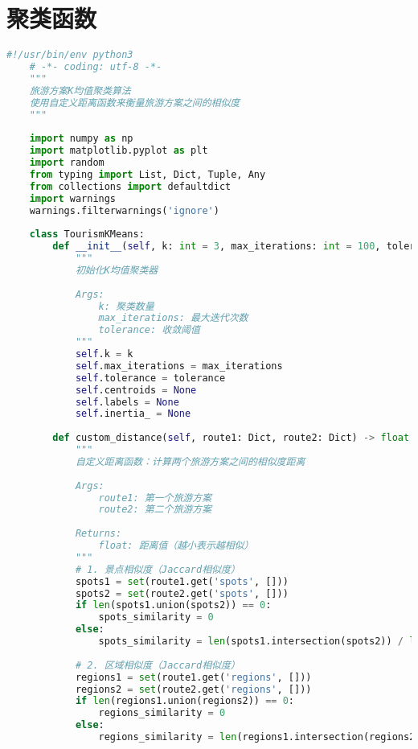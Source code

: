 \section[\hspace{-2pt}聚类函数]{{\heiti{} \hspace{-8pt}聚类函数}}

\begin{lstlisting}[language=Python]
    #!/usr/bin/env python3
    # -*- coding: utf-8 -*-
    """
    旅游方案K均值聚类算法
    使用自定义距离函数来衡量旅游方案之间的相似度
    """
    
    import numpy as np
    import matplotlib.pyplot as plt
    import random
    from typing import List, Dict, Tuple, Any
    from collections import defaultdict
    import warnings
    warnings.filterwarnings('ignore')
    
    class TourismKMeans:
        def __init__(self, k: int = 3, max_iterations: int = 100, tolerance: float = 1e-4):
            """
            初始化K均值聚类器
            
            Args:
                k: 聚类数量
                max_iterations: 最大迭代次数
                tolerance: 收敛阈值
            """
            self.k = k
            self.max_iterations = max_iterations
            self.tolerance = tolerance
            self.centroids = None
            self.labels = None
            self.inertia_ = None
            
        def custom_distance(self, route1: Dict, route2: Dict) -> float:
            """
            自定义距离函数：计算两个旅游方案之间的相似度距离
            
            Args:
                route1: 第一个旅游方案
                route2: 第二个旅游方案
                
            Returns:
                float: 距离值（越小表示越相似）
            """
            # 1. 景点相似度（Jaccard相似度）
            spots1 = set(route1.get('spots', []))
            spots2 = set(route2.get('spots', []))
            if len(spots1.union(spots2)) == 0:
                spots_similarity = 0
            else:
                spots_similarity = len(spots1.intersection(spots2)) / len(spots1.union(spots2))
            
            # 2. 区域相似度（Jaccard相似度）
            regions1 = set(route1.get('regions', []))
            regions2 = set(route2.get('regions', []))
            if len(regions1.union(regions2)) == 0:
                regions_similarity = 0
            else:
                regions_similarity = len(regions1.intersection(regions2)) / len(regions1.union(regions2))
            

\end{lstlisting}
